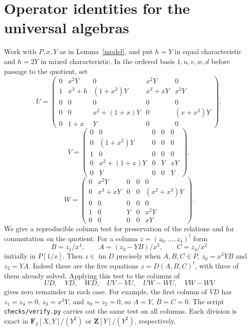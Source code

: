 \appendix
\section{Operator identities for the universal algebras}\label{cert}
Work with $P,x,Y$ as in Lemma~\ref{model}, and put $h=Y$ in equal characteristic and $h=2Y$ in mixed characteristic. In the ordered basis $1,u,v,w,d$ before passage to the quotient, set
\begingroup\small
\[
 U=\begin{pmatrix}
 0&x^2Y&0&x^2Y&0\\
 1&x^3+h&(1+x^2)Y&x^3+xY&x^2Y\\
 0&0&0&0&0\\
 0&0&x^2+(1+x)Y&0&(x+x^2)Y\\
 0&1+x&Y&0&0
 \end{pmatrix},
\]
\[
 V=\begin{pmatrix}0&0&0&0&0\\0&(1+x^2)Y&0&0&0\\
 1&0&0&0&0\\0&x^2+(1+x)Y&0&Y&xY\\0&Y&0&0&Y
 \end{pmatrix},
\]
\[
 W=\begin{pmatrix}0&x^2Y&0&0&0\\0&x^3+xY&0&0&(x^2+x^3)Y\\
 0&0&0&0&0\\1&0&Y&0&x^2Y\\0&0&0&0&xY
 \end{pmatrix}.
\]
\endgroup
We give a reproducible column test for preservation of the relations and for commutation on the quotient. For a column $z=(z_0,\ldots,z_4)^t$ form
\[
 B=z_1/x^4,\qquad A=(z_3-YB)/x^3,\qquad C=z_4/x^2
\]
initially in $P[1/x]$. Then $z\in\operatorname{im}D$ precisely when $A,B,C\in P$, $z_0=x^3YB$ and $z_2=YA$. Indeed these are the five equations $z=D(A,B,C)^t$, with three of them already solved. Applying this test to the columns of
\[
 UD,\quad VD,\quad WD,\quad UV-VU,\quad UW-WU,\quad VW-WV
\]
gives zero remainder in each case. For example, the first column of $VD$ has $z_1=z_4=0$, $z_3=x^3Y$, and $z_0=z_2=0$, so $A=Y$, $B=C=0$. The script \texttt{checks/verify.py} carries out the same test on all columns. Each division is exact in $\mathbf F_2[X,Y]/(Y^2)$ or $\mathbf Z[Y]/(Y^2)$, respectively.
